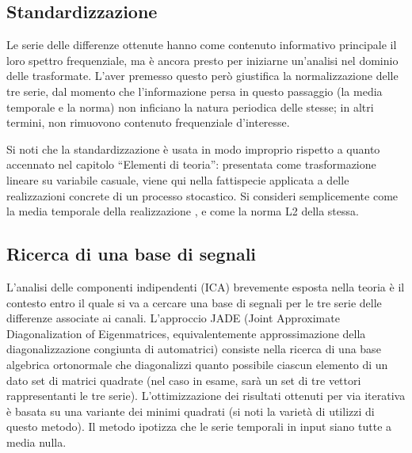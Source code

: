 	\subsection{Standardizzazione}
Le serie delle differenze ottenute hanno come contenuto informativo principale il loro spettro frequenziale, ma è ancora presto per iniziarne un'analisi nel dominio delle trasformate. L'aver premesso questo però giustifica la normalizzazione delle tre serie, dal momento che l'informazione persa in questo passaggio (la media temporale e la norma) non inficiano la natura periodica delle stesse; in altri termini, non rimuovono contenuto frequenziale d'interesse.

 Si noti che la standardizzazione è usata in modo improprio rispetto a quanto accennato nel capitolo ``Elementi di teoria'': presentata come trasformazione lineare su variabile casuale, viene qui nella fattispecie applicata a delle realizzazioni concrete di un processo stocastico. Si consideri semplicemente  come la media temporale della realizzazione , e  come la norma L2 della stessa.
	\subsection{Ricerca di una base di segnali}
L'analisi delle componenti indipendenti (ICA) brevemente esposta nella teoria è il contesto entro il quale si va a cercare una base di segnali per le tre serie delle differenze associate ai canali. L'approccio JADE (Joint Approximate Diagonalization of Eigenmatrices, equivalentemente approssimazione della diagonalizzazione congiunta di automatrici) consiste nella ricerca di una base algebrica ortonormale che diagonalizzi quanto possibile ciascun elemento di un dato set di matrici quadrate (nel caso in esame, sarà un set di tre vettori rappresentanti le tre serie). L'ottimizzazione dei risultati ottenuti per via iterativa è basata su una variante dei minimi quadrati (si noti la varietà di utilizzi di questo metodo). Il metodo ipotizza che le serie temporali in input siano tutte a media nulla.

